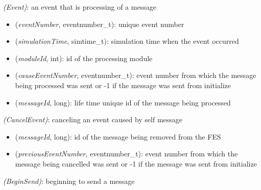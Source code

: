  \textit{(Event)}: an event that is processing of a message

\begin{itemize}
  \item \tbf{\#} (\textit{eventNumber}, eventnumber\_t): unique event number
  \item {} (\textit{simulationTime}, simtime\_t): simulation time when the event occurred
  \item {} (\textit{moduleId}, int): id of the processing module
  \item {} (\textit{causeEventNumber}, eventnumber\_t): event number from which the message being processed was sent or -1 if the message was sent from initialize
  \item {} (\textit{messageId}, long): life time unique id of the message being processed
\end{itemize}

 \textit{(CancelEvent)}: canceling an event caused by self message

\begin{itemize}
  \item {} (\textit{messageId}, long): id of the message being removed from the FES
  \item {} (\textit{previousEventNumber}, eventnumber\_t): event number from which the message being cancelled was sent or -1 if the message was sent from initialize
\end{itemize}

 \textit{(BeginSend)}: beginning to send a message

